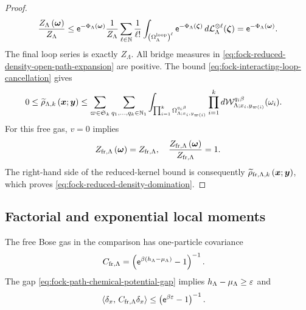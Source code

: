 \documentclass[11pt,a4paper]{article}
\theoremstyle{plain}
\theoremstyle{definition}
\theoremstyle{remark}
\begin{document}
\begin{proof}
$$\begin{aligned}
\frac{Z_{\Lambda} \left( \boldsymbol{\omega} \right)}{Z_{\Lambda}}
\leq
\mathsf{e}^{-\Phi_{\Lambda} \left( \boldsymbol{\omega} \right)}
\frac{1}{Z_{\Lambda}}
\sum_{\ell \in \mathbb{N}}\frac{1}{\ell!}
\int_{\left( \Omega_{\Lambda}^{\mathrm{loop}} \right)^{\ell}}
\mathsf{e}^{-\Phi_{\Lambda} \left( \boldsymbol{\zeta} \right)}
\mathop{d \mathcal{L}_{\Lambda}^{\otimes\ell}}(\boldsymbol{\zeta})
=
\mathsf{e}^{-\Phi_{\Lambda} \left( \boldsymbol{\omega} \right)}.
\end{aligned}$$
The final loop series is exactly $Z_{\Lambda}$.
All bridge measures in \eqref{eq:fock-reduced-density-open-path-expansion} are positive.
The bound \eqref{eq:fock-interacting-loop-cancellation} gives
$$\begin{aligned}
0
\leq
\fun{\widetilde{\rho}_{\Lambda,k}}{\boldsymbol{x};\boldsymbol{y}}
& \leq
\sum_{\varpi \in \grsym{k}}
\sum_{q_1,\ldots,q_k\in\semigrposint}
\int_{\prod_{i=1}^{k}
\Omega_{\Lambda;x_i,y_{\fun{\varpi}{i}}}^{q_i\beta}}
\prod_{i=1}^{k}
\opdmsr{\msrcal{W}_{\Lambda;x_i,y_{\fun{\varpi}{i}}}^{q_i\beta}}(\omega_i).
\end{aligned}$$
For this free gas, $v=0$ implies
$$\begin{aligned}
Z_{\mathrm{fr},\Lambda} \left( \boldsymbol{\omega} \right)
=
Z_{\mathrm{fr},\Lambda},
\quad
\frac{Z_{\mathrm{fr},\Lambda} \left( \boldsymbol{\omega} \right)}
{Z_{\mathrm{fr},\Lambda}}
=
1.
\end{aligned}$$
The right-hand side of the reduced-kernel bound is consequently
$\widetilde{\rho}_{\mathrm{fr},\Lambda,k} \left( \boldsymbol{x};\boldsymbol{y} \right)$, which proves
\eqref{eq:fock-reduced-density-domination}.
\end{proof}

\subsection{Factorial and exponential local moments}\label{factorial-and-exponential-local-moments}

The free Bose gas in the comparison has one-particle covariance \[\begin{aligned}
C_{\txtfr,\Lambda}
& =
\rbk{\napiernum^{\beta\rbk{\physham[h]_{\Lambda} - \smchemicalpotential_{\Lambda}}} - 1}^{-1}.
\end{aligned}\] The gap \eqref{eq:fock-path-chemical-potential-gap} implies \(\physham[h]_{\Lambda} - \smchemicalpotential_{\Lambda} \geq \varepsilon\) and \[\begin{aligned}
\left\langle \delta_x,\,C_{\mathrm{fr},\Lambda}\delta_x \right\rangle
& \leq
\left( \mathsf{e}^{\beta\varepsilon} - 1 \right)^{-1}.
\end{aligned}\]
\end{document}
